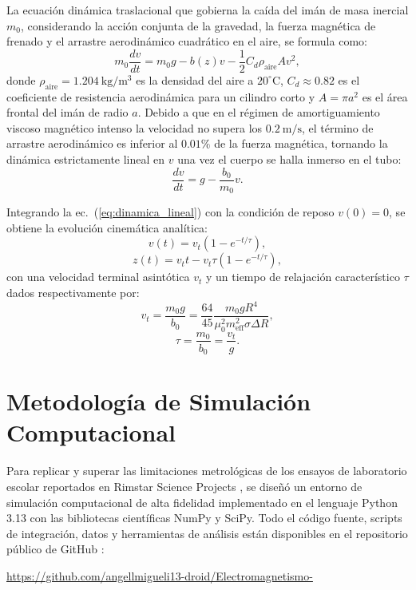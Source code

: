 \documentclass[aps,prb,reprint,twocolumn,superscriptaddress,amsmath,amssymb,floatfix]{revtex4-2}
\begin{document}
La ecuación dinámica traslacional que gobierna la caída del imán de masa inercial $m_0$, considerando la acción conjunta de la gravedad, la fuerza magnética de frenado y el arrastre aerodinámico cuadrático en el aire, se formula como:
\begin{equation}
m_0 \frac{dv}{dt} = m_0 g - b(z) v - \frac{1}{2} C_d \rho_{\mathrm{aire}} A v^2,
\label{eq:dinamica}
\end{equation}
donde $\rho_{\mathrm{aire}} = 1.204\ \mathrm{kg/m^3}$ es la densidad del aire a $20^\circ\mathrm{C}$, $C_d \approx 0.82$ es el coeficiente de resistencia aerodinámica para un cilindro corto y $A = \pi a^2$ es el área frontal del imán de radio $a$. Debido a que en el régimen de amortiguamiento viscoso magnético intenso la velocidad no supera los $0.2\ \mathrm{m/s}$, el término de arrastre aerodinámico es inferior al $0.01\%$ de la fuerza magnética, tornando la dinámica estrictamente lineal en $v$ una vez el cuerpo se halla inmerso en el tubo:
\begin{equation}
\frac{dv}{dt} = g - \frac{b_0}{m_0} v.
\label{eq:dinamica_lineal}
\end{equation}

Integrando la ec.~(\ref{eq:dinamica_lineal}) con la condición de reposo $v(0) = 0$, se obtiene la evolución cinemática analítica:
\begin{equation}
v(t) = v_t \left(1 - e^{-t/\tau}\right),
\label{eq:v_analitico}
\end{equation}
\begin{equation}
z(t) = v_t t - v_t \tau \left(1 - e^{-t/\tau}\right),
\label{eq:z_analitico}
\end{equation}
con una velocidad terminal asintótica $v_t$ y un tiempo de relajación característico $\tau$ dados respectivamente por:
\begin{equation}
v_t = \frac{m_0 g}{b_0} = \frac{64}{45} \frac{m_0 g R^4}{\mu_0^2 m_{\mathrm{eff}}^2 \sigma \Delta R},
\label{eq:vt_analitico}
\end{equation}
\begin{equation}
\tau = \frac{m_0}{b_0} = \frac{v_t}{g}.
\label{eq:tau_analitico}
\end{equation}

\section{Metodología de Simulación Computacional}
Para replicar y superar las limitaciones metrológicas de los ensayos de laboratorio escolar reportados en Rimstar Science Projects \cite{Rimstar2013}, se diseñó un entorno de simulación computacional de alta fidelidad implementado en el lenguaje Python 3.13 con las bibliotecas científicas NumPy y SciPy. Todo el código fuente, scripts de integración, datos y herramientas de análisis están disponibles en el repositorio público de GitHub \cite{Rimstar2013}:
\begin{center}
\url{https://github.com/angellmigueli13-droid/Electromagnetismo-}
\end{center}
\end{document}
